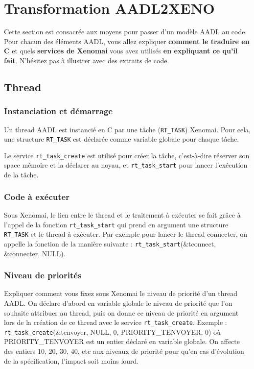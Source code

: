 \documentclass[11pt, a4paper]{paper}
\begin{document}
{%
\section{Transformation AADL2XENO}
 
 {\color{red} Cette section est consacrée aux moyens pour passer d'un modèle AADL au code. Pour chacun des éléments AADL, vous allez expliquer {\bf comment le traduire en C} et quels {\bf services de Xenomai} vous avez utilisés {\bf en expliquant ce qu'il fait}. N'hésitez pas à illustrer avec des extraits de code.}
 
\subsection{Thread}
\subsubsection{Instanciation et démarrage}
{\color{black} Un thread AADL est instancié en C par une tâche ({\tt RT\_TASK}) Xenomai.  Pour cela, une structure {\tt RT\_TASK} est déclarée comme variable globale pour chaque tâche.

Le service {\tt rt\_task\_create} est utilisé pour créer la tâche, c'est-à-dire réserver son space mémoire et la déclarer au noyau, et {\tt rt\_task\_start} pour lancer l'exécution de la tâche.}

\subsubsection{Code à exécuter}
 {\color{black} Sous Xenomai, le lien entre le thread et le traitement à exécuter se fait grâce à l'appel de la fonction {\tt rt\_task\_start} qui prend en argument une structure {\tt RT\_TASK} et le thread à exécuter. Par exemple pour lancer le thread connecter, on appelle la fonction de la manière suivante : {\tt rt\_task\_start}(\&tconnect, \&connecter, NULL).}

\subsubsection{Niveau de priorités}
 {\color{black} Expliquer comment vous fixez sous Xenomai le niveau de priorité d'un thread AADL. On déclare d'abord en variable globale le niveau de priorité que l'on souhaite attribuer au thread, puis on donne ce niveau de priorité en argument lors de la création de ce thread avec le service {\tt rt\_task\_create}}. Exemple : {\tt rt\_task\_create}(\&tenvoyer, NULL, 0, PRIORITY\_TENVOYER, 0) où PRIORITY\_TENVOYER est un entier déclaré en variable globale. On affecte des entiers 10, 20, 30, 40, etc aux niveaux de priorité pour qu'en cas d'évolution de la spécification, l'impact soit moins lourd.}
\end{document}
